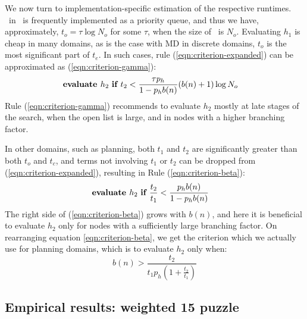 We now turn to implementation-specific estimation of the respective runtimes.
\OPEN~in \astar~is frequently implemented as a priority queue, and thus we have, approximately,
$t_o=\tau \log N_o$ for some $\tau$, when the size of \OPEN~is $N_o$.
Evaluating $h_1$ is cheap in many domains, as is the
case with MD in discrete domains, $t_o$ is the most significant part of
$t_{e}$. In such cases,
rule (\ref{eqn:criterion-expanded}) can be approximated as (\ref{eqn:criterion-gamma}):
\begin{align}
  &\mbox{\bf evaluate }h_2\mbox{ \bf if } t_2 < \frac {\tau p_h} {1-p_hb(n)} (b(n)+1)\log N_o
\label{eqn:criterion-gamma}
\end{align}
Rule (\ref{eqn:criterion-gamma})
recommends to evaluate $h_2$ mostly at late stages of the search,
when the open list is large, and in nodes with a higher branching factor.

In other domains, such as planning, both $t_1$ and $t_2$ are
significantly greater than both $t_o$ and $t_c$, and terms
not involving $t_1$ or $t_2$ can be dropped from
(\ref{eqn:criterion-expanded}), resulting in Rule (\ref{eqn:criterion-beta}):
\begin{align}
  &\mbox{\bf evaluate }h_2\mbox{ \bf if } \frac{t_2}{t_1} < \frac {p_hb(n)} {1-p_hb(n)}
\label{eqn:criterion-beta}
\end{align}
The right side of (\ref{eqn:criterion-beta}) grows with $b(n)$, and here it is beneficial to evaluate $h_2$
only for nodes with a sufficiently large branching factor. On rearranging equation \ref{eqn:criterion-beta},
we get the criterion which we actually use for planning domains,
which is to evaluate $h_2$ only when:
\begin{equation}
b(n) > \frac{t_2}{t_1 p_h (1 + \frac{t_2}{t_1})}
\label{eq:planning-rule}
\end{equation}

\subsection{Empirical results: weighted 15 puzzle}


